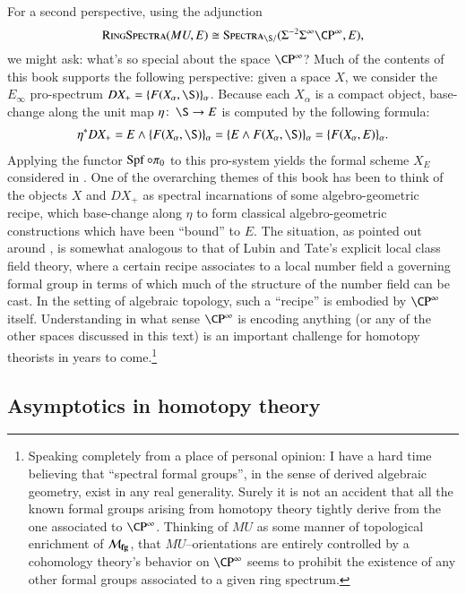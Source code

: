 For a second perspective, using the adjunction \[\CatOf{RingSpectra}(MU, E) \cong \CatOf{Spectra}_{\S/}(\Susp^{-2} \Susp^\infty \CP^\infty, E),\] we might ask: what's so special about the space $\CP^\infty$?  Much of the contents of this book supports the following perspective: given a space $X$, we consider the $E_\infty$ pro-spectrum $DX_+ = \{F(X_\alpha, \S)\}_\alpha$.  Because each $X_\alpha$ is a compact object, base-change along the unit map $\eta\co \S \to E$ is computed by the following formula:
\begin{align*}
\eta^* DX_+ = E \sm \{F(X_\alpha, \S)\}_\alpha = \{E \sm F(X_\alpha, \S)\}_\alpha = \{F(X_\alpha, E)\}_\alpha.
\end{align*}
Applying the functor $\operatorname{Spf} \circ \pi_0$ to this pro-system yields the formal scheme $X_E$ considered in .  One of the overarching themes of this book has been to think of the objects $X$ and $DX_+$ as spectral incarnations of some algebro-geometric recipe, which base-change along $\eta$ to form classical algebro-geometric constructions which have been ``bound'' to $E$.  The situation, as pointed out around , is somewhat analogous to that of Lubin and Tate's explicit local class field theory, where a certain recipe associates to a local number field a governing formal group in terms of which much of the structure of the number field can be cast.  In the setting of algebraic topology, such a ``recipe'' is embodied by $\CP^\infty$ itself.  Understanding in what sense $\CP^\infty$ is encoding anything (or any of the other spaces discussed in this text) is an important challenge for homotopy theorists in years to come.\footnote{Speaking completely from a place of personal opinion: I have a hard time believing that ``spectral formal groups'', in the sense of derived algebraic geometry, exist in any real generality.  Surely it is not an accident that all the known formal groups arising from homotopy theory tightly derive from the one associated to $\CP^\infty$.  Thinking of $MU$ as some manner of topological enrichment of $\mathcal{M}_{\mathbf{fg}}$, that $MU$--orientations are entirely controlled by a cohomology theory's behavior on $\CP^\infty$ seems to prohibit the existence of any other formal groups associated to a given ring spectrum.}












\subsection*{Asymptotics in homotopy theory}

